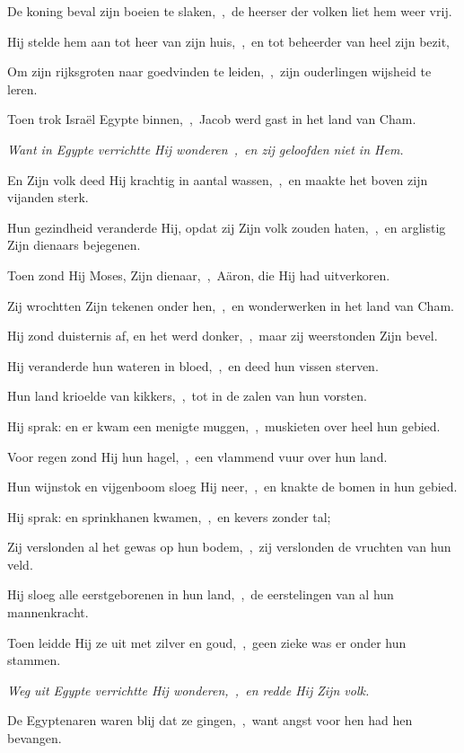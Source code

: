 \documentclass[12pt,twoside,a5paper]{article}
\begin{document}
\begin{halfparskip}
  De koning beval zijn boeien te slaken,~\sep\ de heerser der volken liet hem weer vrij.

  Hij stelde hem aan tot heer van zijn huis,~\sep\ en tot beheerder van heel zijn bezit,

  Om zijn rijksgroten naar goedvinden te leiden,~\sep\ zijn ouderlingen wijsheid te leren.

  Toen trok Israël Egypte binnen,~\sep\ Jacob werd gast in het land van Cham.

  \emph{Want in Egypte verrichtte Hij wonderen~\sep\ en zij geloofden niet in Hem.}

  En Zijn volk deed Hij krachtig in aantal wassen,~\sep\ en maakte het boven zijn vijanden sterk.

  Hun gezindheid veranderde Hij, opdat zij Zijn volk zouden haten,~\sep\ en arglistig Zijn dienaars bejegenen.

  Toen zond Hij Moses, Zijn dienaar,~\sep\ Aäron, die Hij had uitverkoren.

  Zij wrochtten Zijn tekenen onder hen,~\sep\ en wonderwerken in het land van Cham.

  Hij zond duisternis af, en het werd donker,~\sep\ maar zij weerstonden Zijn bevel.

  Hij veranderde hun wateren in bloed,~\sep\ en deed hun vissen sterven.

  Hun land krioelde van kikkers,~\sep\ tot in de zalen van hun vorsten.

  Hij sprak: en er kwam een menigte muggen,~\sep\ muskieten over heel hun gebied.

  Voor regen zond Hij hun hagel,~\sep\ een vlammend vuur over hun land.

  Hun wijnstok en vijgenboom sloeg Hij neer,~\sep\ en knakte de bomen in hun gebied.

  Hij sprak: en sprinkhanen kwamen,~\sep\ en kevers zonder tal;

  Zij verslonden al het gewas op hun bodem,~\sep\ zij verslonden de vruchten van hun veld.

  Hij sloeg alle eerstgeborenen in hun land,~\sep\ de eerstelingen van al hun mannenkracht.

  Toen leidde Hij ze uit met zilver en goud,~\sep\ geen zieke was er onder hun stammen.

  \emph{Weg uit Egypte verrichtte Hij wonderen,~\sep\ en redde Hij Zijn volk.}

  De Egyptenaren waren blij dat ze gingen,~\sep\ want angst voor hen had hen bevangen.


\end{halfparskip}
\end{document}
